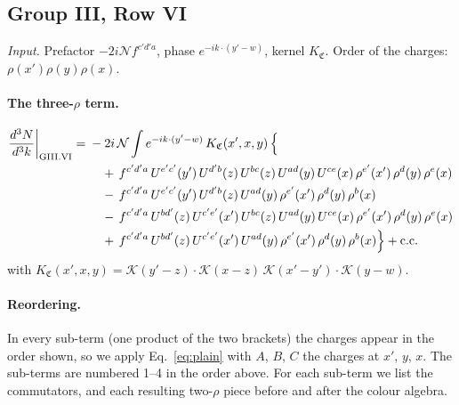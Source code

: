 \documentclass[10pt]{article}
\numberwithin{equation}{section}
\newcommand{\KK}{\mathcal K}
\newcommand{\NN}{\mathcal N}
\begin{document}
\subsection{Group III, Row VI}\label{sec:GIII.VI}
\emph{Input.} Prefactor $-2i\NN f^{c'd'a}$, phase $e^{-ik\cdot(y'-w)}$, kernel $K_{\mathfrak C}$. Order of the charges: $\rho(x')\rho(y)\rho(x)$.
\paragraph{The three-$\rho$ term.}
\begin{align}
\frac{d^3N}{d^3k}\bigg|_{\rm GIII.VI}={}&-2i\,\NN\int e^{-ik\cdot(y'-w)}\,K_{\mathfrak C}(x',x,y)\,\Big\{\notag\\
&\quad +\,f^{c'd'a}\,U^{e'c'}(y')\,U^{d'b}(z)\,U^{bc}(z)\,U^{ad}(y)\,U^{ce}(x)\,\rho^{e'}(x')\,\rho^{d}(y)\,\rho^{e}(x)\notag\\
&\quad -\,f^{c'd'a}\,U^{e'c'}(y')\,U^{d'b}(z)\,U^{ad}(y)\,\rho^{e'}(x')\,\rho^{d}(y)\,\rho^{b}(x)\notag\\
&\quad -\,f^{c'd'a}\,U^{bd'}(z)\,U^{c'e'}(x')\,U^{bc}(z)\,U^{ad}(y)\,U^{ce}(x)\,\rho^{e'}(x')\,\rho^{d}(y)\,\rho^{e}(x)\notag\\
&\quad +\,f^{c'd'a}\,U^{bd'}(z)\,U^{c'e'}(x')\,U^{ad}(y)\,\rho^{e'}(x')\,\rho^{d}(y)\,\rho^{b}(x)\Big\}+{\rm c.c.}\label{eq:in-GIII.VI}
\end{align}
with $K_{\mathfrak C}(x',x,y)=\KK(y'-z)\cdot\KK(x-z)\,\KK(x'-y')\cdot\KK(y-w)$.
\paragraph{Reordering.} In every sub-term (one product of the two brackets) the charges appear in the order shown, so we apply Eq.~\eqref{eq:plain} with $A$, $B$, $C$ the charges at $x'$, $y$, $x$. The sub-terms are numbered 1--4 in the order above. For each sub-term we list the commutators, and each resulting two-$\rho$ piece before and after the colour algebra.
\end{document}
